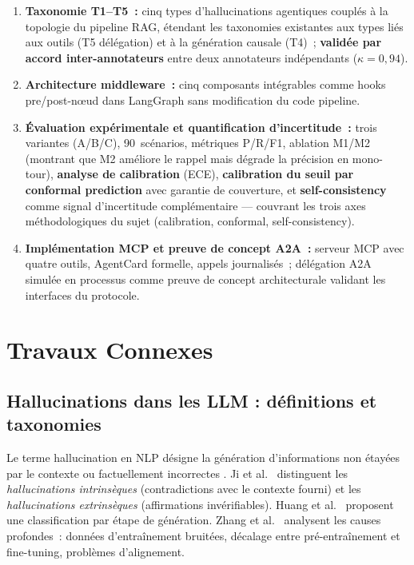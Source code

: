 \documentclass[12pt,a4paper]{article}
\begin{document}
\begin{enumerate}[noitemsep]
  \item \textbf{Taxonomie T1--T5~:} cinq types d'hallucinations agentiques couplés à la topologie du pipeline RAG, étendant les taxonomies existantes aux types liés aux outils (T5 délégation) et à la génération causale (T4)~; \textbf{validée par accord inter-annotateurs} entre deux annotateurs indépendants ($\kappa=0{,}94$).
  \item \textbf{Architecture middleware~:} cinq composants intégrables comme hooks pre/post-nœud dans LangGraph sans modification du code pipeline.
  \item \textbf{Évaluation expérimentale et quantification d'incertitude~:} trois variantes (A/B/C), 90~scénarios, métriques P/R/F1, ablation M1/M2 (montrant que M2 améliore le rappel mais dégrade la précision en mono-tour), \textbf{analyse de calibration} (ECE), \textbf{calibration du seuil par conformal prediction} avec garantie de couverture, et \textbf{self-consistency} comme signal d'incertitude complémentaire --- couvrant les trois axes méthodologiques du sujet (calibration, conformal, self-consistency).
  \item \textbf{Implémentation MCP et preuve de concept A2A~:} serveur MCP avec quatre outils, AgentCard formelle, appels journalisés~; délégation A2A simulée en processus comme preuve de concept architecturale validant les interfaces du protocole.
\end{enumerate}

\section{Travaux Connexes}

\subsection{Hallucinations dans les LLM : définitions et taxonomies}

Le terme \og{}hallucination\fg{} en NLP désigne la génération d'informations non étayées par le contexte ou factuellement incorrectes \cite{maynez2020faithfulness}. Ji et al.~\cite{ji2023survey} distinguent les \textit{hallucinations intrinsèques} (contradictions avec le contexte fourni) et les \textit{hallucinations extrinsèques} (affirmations invérifiables). Huang et al.~\cite{huang2023survey} proposent une classification par étape de génération. Zhang et al.~\cite{zhang2023siren} analysent les causes profondes~: données d'entraînement bruitées, décalage entre pré-entraînement et fine-tuning, problèmes d'alignement.
\end{document}
